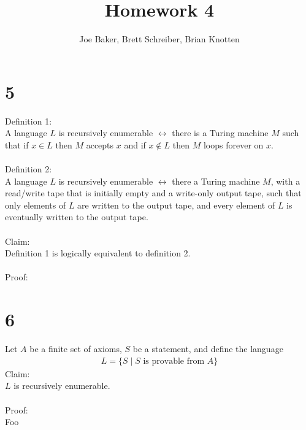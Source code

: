 \documentclass[letterpaper,notitlepage,twoside]{article}
\begin{document}
\title{Homework 4}
\author{Joe Baker, Brett Schreiber, Brian Knotten}
\maketitle

\section*{5}
Definition 1:
\\
A language $L$ is recursively enumerable $\leftrightarrow$ there is a Turing machine $M$ such that if $x \in L$ then $M$ accepts $x$ and if $x \notin L$ then $M$ loops forever on $x$.
\\
\\
Definition 2:
\\
A language $L$ is recursively enumerable $\leftrightarrow$ there a Turing machine $M$, with a read/write tape that is initially empty and a write-only output tape, such that only elements of $L$ are written to the output tape, and every element of $L$ is eventually written to the output tape.
\\
\\
Claim:
\\
Definition 1 is logically equivalent to definition 2.
\\
\\
Proof:
\\

\section*{6}
Let $A$ be a finite set of axioms, $S$ be a statement, and define the language
\begin{align*}
L = \lbrace S \mid S \text{ is provable from } A \rbrace
\end{align*}
Claim:
\\
$L$ is recursively enumerable.
\\\\
Proof:
\\
Foo
\end{document}
